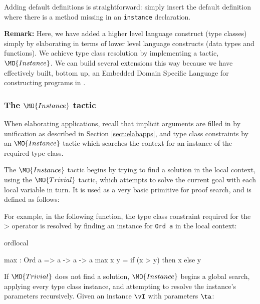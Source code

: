 Adding default definitions is straightforward: simply insert the default definition where
there is a method missing in an \texttt{instance} declaration.

\textbf{Remark:} Here, we have added a higher level language construct (type
classes) simply by elaborating in terms of lower level language constructs
(data types and functions).  We achieve type class resolution by implementing a
tactic, $\MO{Instance}$.  We can build several extensions this way because we
have effectively built, bottom up, an Embedded Domain Specific Language for
constructing programs in \TT{}.

\subsubsection{The $\MO{Instance}$ tactic}

\label{sect:instance}

When elaborating applications, recall that implicit arguments are filled in by
unification as described in Section \ref{sect:elabapps}, and type class
constraints by an $\MO{Instance}$ tactic which searches the context for an
instance of the required type class. 

The $\MO{Instance}$ tactic begins by trying to find a solution in the local context,
using the $\MO{Trivial}$ tactic, which attempts
to solve the current goal with each local variable in turn. It is used as a very
basic primitive for proof search, and is defined as follows:


For example, in the following function, the type class constraint required for
the $\texttt{>}$ operator is resolved by finding an instance for \texttt{Ord a}
in the local context:

\begin{SaveVerbatim}{ordlocal}

max : Ord a => a -> a -> a
max x y = if (x > y) then x else y

\end{SaveVerbatim}

If $\MO{Trivial}$ does not find a solution, $\MO{Instance}$ begins a global search,
applying every type class instance, and attempting to resolve the instance's parameters
recursively. Given an instance $\vI$ with parameters $\ta$:


